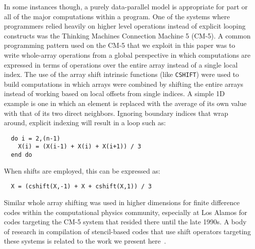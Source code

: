 In some instances though, a purely data-parallel model is appropriate
for part or all of the major computations within a program.  One of
the systems where programmers relied heavily on higher level
operations instead of explicit looping constructs was the Thinking
Machines Connection Machine 5 (CM-5).  A common programming pattern
used on the CM-5 that we exploit in this paper was to write
whole-array operations from a global perspective in which computations
are expressed in terms of operations over the entire array instead of
a single local index.  The use of the array shift intrinsic functions
(like {\tt CSHIFT}) were used to build computations in which arrays
were combined by shifting the entire arrays instead of working based
on local offsets from single indices.  A simple 1D example is one in
which an element is replaced with the average of its own value with
that of its two direct neighbors.  Ignoring boundary indices that wrap
around, explicit indexing will result in a loop such as:

{\small
\begin{verbatim}
  do i = 2,(n-1)
    X(i) = (X(i-1) + X(i) + X(i+1)) / 3
  end do
\end{verbatim}
}

\noindent When shifts are employed, this can be expressed as:

{\small
\begin{verbatim}
  X = (cshift(X,-1) + X + cshift(X,1)) / 3
\end{verbatim}
}

Similar whole array shifting was used in higher dimensions for finite
difference codes within the computational physics community, especially
at Los Alamos for codes targeting the CM-5 system that resided there until the
late 1990s.  A body of research in compilation of stencil-based codes
that use shift operators targeting these systems is related to the
work we present here~\cite{stencil-compiler}.

